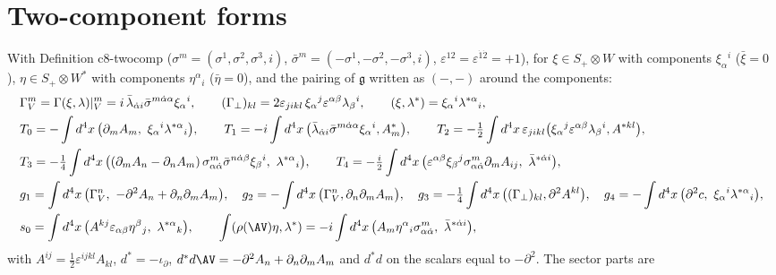 \section{Two-component forms}
\label{sec:at-twocomp}

\begin{remark}
\label{rem:at-twocomp}
With Definition c8-twocomp ($\sigma^m=(\sigma^1,\sigma^2,\sigma^3,i)$, $\bar\sigma^m=(-\sigma^1,-\sigma^2,-\sigma^3,i)$, $\varepsilon^{12}=\varepsilon^{\dot1\dot2}=+1$), for $\xi\in S_+\otimes W$ with components $\xi_\alpha{}^i$ ($\bar\xi=0$), $\eta\in S_+\otimes W^*$ with components $\eta^\alpha{}_i$ ($\bar\eta=0$), and the pairing of $\mathfrak g$ written as $(-,-)$ around the components:
\[
\begin{aligned}
&\Gamma_V^m=\Gamma(\xi,\lambda)|_V^m=i\,\bar\lambda_{\dot\alpha i}\bar\sigma^{m\dot\alpha\alpha}\xi_\alpha{}^i,\qquad (\Gamma_\perp)_{kl}=2\varepsilon_{jikl}\,\xi_\alpha{}^j\varepsilon^{\alpha\beta}\lambda_\beta{}^i,\qquad (\xi,\lambda^*)=\xi_\alpha{}^i\lambda^{*\alpha}{}_i,\\
&T_0=-\int d^4x\,\big(\partial_mA_m,\ \xi_\alpha{}^i\lambda^{*\alpha}{}_i\big),\qquad T_1=-i\int d^4x\,\big(\bar\lambda_{\dot\alpha i}\bar\sigma^{m\dot\alpha\alpha}\xi_\alpha{}^i,A^*_m\big),\qquad T_2=-\tfrac12\int d^4x\,\varepsilon_{jikl}\big(\xi_\alpha{}^j\varepsilon^{\alpha\beta}\lambda_\beta{}^i,A^{*kl}\big),\\
&T_3=-\tfrac14\int d^4x\,\big((\partial_mA_n-\partial_nA_m)\,\sigma^m_{\alpha\dot\alpha}\bar\sigma^{n\dot\alpha\beta}\xi_\beta{}^i,\ \lambda^{*\alpha}{}_i\big),\qquad T_4=-\tfrac i2\int d^4x\,\big(\varepsilon^{\alpha\beta}\xi_\beta{}^j\sigma^m_{\alpha\dot\alpha}\partial_mA_{ij},\ \bar\lambda^{*\dot\alpha i}\big),\\
&g_1=\int d^4x\,\big(\Gamma_V^n,\ -\partial^2A_n+\partial_n\partial_mA_m\big),\quad g_2=-\int d^4x\,\big(\Gamma_V^n,\partial_n\partial_mA_m\big),\quad g_3=-\tfrac14\int d^4x\,\big((\Gamma_\perp)_{kl},\partial^2A^{kl}\big),\quad g_4=-\int d^4x\,\big(\partial^2c,\ \xi_\alpha{}^i\lambda^{*\alpha}{}_i\big),\\
&s_0=\int d^4x\,\big(A^{kj}\varepsilon_{\alpha\beta}\eta^\beta{}_j,\ \lambda^{*\alpha}{}_k\big),\qquad \int(\rho(\AV)\eta,\lambda^*)=-i\int d^4x\,\big(A_m\eta^\alpha{}_i\sigma^m_{\alpha\dot\alpha},\ \bar\lambda^{*\dot\alpha i}\big),
\end{aligned}
\]
with $A^{ij}=\tfrac12\varepsilon^{ijkl}A_{kl}$, $d^*=-\iota_\partial$, $d^*d\AV=-\partial^2A_n+\partial_n\partial_mA_m$ and $d^*d$ on the scalars equal to $-\partial^2$. The sector parts are

\end{remark}
